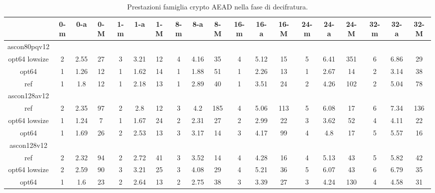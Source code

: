 \documentclass[12pt,a4paper,italian]{report}
\begin{document}
\begin{landscape}
    \begin{table}[]
        \caption{Prestazioni famiglia crypto AEAD nella fase di decifratura.}
        \begin{adjustbox}{width=600pt}
            \centering
			\begin{tabular}{|c|c|c|c|c|c|c|c|c|c|c|c|c|c|c|c|c|c|c|}
				\hline
				& 0-m & 0-a & 0-M & 1-m & 1-a & 1-M & 8-m & 8-a & 8-M & 16-m & 16-a & 16-M & 24-m & 24-a & 24-M & 32-m & 32-a & 32-M \\
				\hline
				ascon80pqv12 & & & & & & & & & & & & & & & & & & \\
				\hline
				opt64 lowsize & 2 & 2.55 & 27 & 3 & 3.21 & 12 & 4 & 4.16 & 35 & 4 & 5.12 & 15 & 5 & 6.41 & 351 & 6 & 6.86 & 29 \\
				\hline
				opt64 & 1 & 1.26 & 12 & 1 & 1.62 & 14 & 1 & 1.88 & 51 & 1 & 2.26 & 13 & 1 & 2.67 & 14 & 2 & 3.14 & 38 \\
				\hline
				ref & 1 & 1.8 & 12 & 1 & 2.18 & 13 & 1 & 2.89 & 40 & 1 & 3.51 & 24 & 2 & 4.26 & 102 & 2 & 5.04 & 78 \\
				\hline
				ascon128av12 & & & & & & & & & & & & & & & & & & \\
				\hline
				ref & 2 & 2.35 & 97 & 2 & 2.8 & 12 & 3 & 4.2 & 185 & 4 & 5.06 & 113 & 5 & 6.08 & 17 & 6 & 7.34 & 136 \\
				\hline
				opt64 lowsize & 1 & 1.24 & 7 & 1 & 1.67 & 24 & 2 & 2.31 & 27 & 2 & 2.99 & 22 & 3 & 3.62 & 52 & 4 & 4.11 & 22 \\
				\hline
				opt64 & 1 & 1.69 & 26 & 2 & 2.53 & 13 & 3 & 3.17 & 14 & 3 & 4.17 & 99 & 4 & 4.8 & 17 & 5 & 5.57 & 16 \\
				\hline
				ascon128v12 & & & & & & & & & & & & & & & & & & \\
				\hline
				ref & 2 & 2.32 & 94 & 2 & 2.72 & 41 & 3 & 3.52 & 14 & 4 & 4.28 & 16 & 4 & 5.13 & 43 & 5 & 5.82 & 42 \\
				\hline
				opt64 lowsize & 2 & 2.59 & 90 & 3 & 3.21 & 25 & 3 & 4.08 & 29 & 4 & 5.21 & 36 & 5 & 6.07 & 43 & 6 & 6.79 & 35 \\
				\hline
				opt64 & 1 & 1.6 & 23 & 2 & 2.64 & 13 & 2 & 2.75 & 38 & 3 & 3.39 & 27 & 3 & 4.24 & 130 & 4 & 4.58 & 31 \\
				\hline
			\end{tabular}
		\end{adjustbox}
	\end{table}
\end{landscape}
\end{document}
